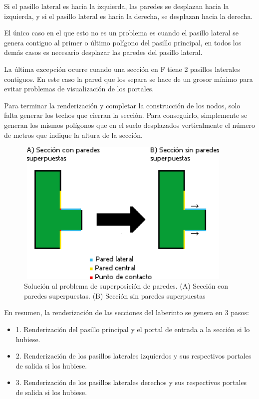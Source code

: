 \documentclass[../main.tex]{subfiles}
\begin{document}
Si el pasillo lateral es hacia la izquierda, las paredes se desplazan hacia la izquierda, y si el pasillo lateral es hacia la derecha, se desplazan  hacia la derecha.

El único caso en el que esto no es un problema es cuando el pasillo lateral se genera contiguo al primer o último polígono del pasillo principal, en todos los demás casos es necesario desplazar las paredes del pasillo lateral.

La última excepción ocurre cuando una sección en F tiene 2 pasillos laterales contiguos. En este caso la pared que los separa se hace de un grosor mínimo para evitar problemas de visualización de los portales.

Para terminar la renderización y completar la construcción de los nodos, solo falta generar los techos que cierran la sección. Para conseguirlo, simplemente se generan los mismos polígonos que en el suelo desplazados verticalmente el número de metros que indique la altura de la sección.

\begin{figure}[ht!]
\centering
\includegraphics[width=10.5cm, height=7cm]{imagenes/Wall_Overlapping.png}
\caption{Solución al problema de superposición de paredes. (A) Sección con paredes superpuestas. (B) Sección sin paredes superpuestas}
\label{fig:Wall_Overlapping}
\end{figure}

En resumen, la renderización de las secciones del laberinto se genera en 3 pasos:

\begin{itemize}
    \item 1. Renderización del pasillo principal y el portal de entrada a la sección si lo hubiese.
    \item 2. Renderización de los pasillos laterales izquierdos y sus respectivos portales de salida si los hubiese.
    \item 3. Renderización de los pasillos laterales derechos y sus respectivos portales de salida si los hubiese.
\end{itemize}
\end{document}
